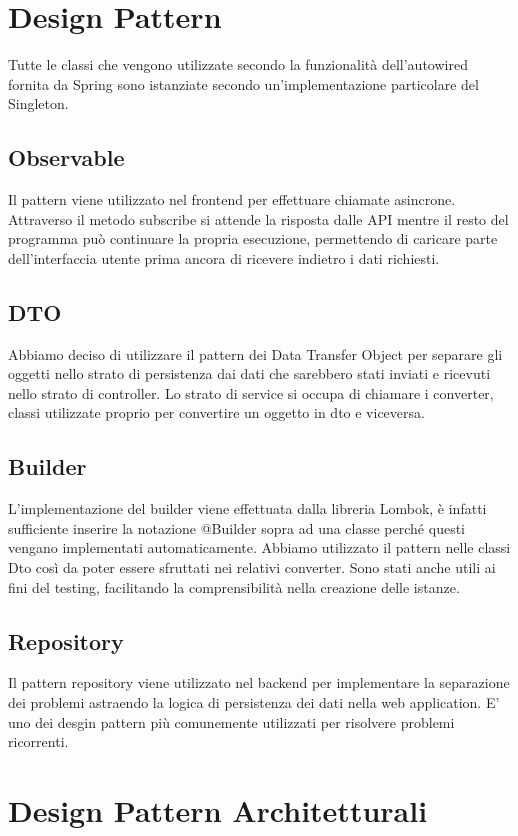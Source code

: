 \documentclass{article}
\begin{document}
\section{Design Pattern}
Tutte le classi che vengono utilizzate secondo la funzionalità dell’autowired fornita da Spring sono istanziate secondo un’implementazione particolare del Singleton.\\
\subsection{Observable}
Il pattern viene utilizzato nel frontend per effettuare chiamate asincrone. Attraverso il metodo subscribe si attende la risposta dalle API mentre il resto del programma può continuare la propria esecuzione, permettendo di caricare parte dell’interfaccia utente prima ancora di ricevere indietro i dati richiesti.
\subsection{DTO}
Abbiamo deciso di utilizzare il pattern dei Data Transfer Object per separare gli oggetti nello strato di persistenza dai dati che sarebbero stati inviati e ricevuti nello strato di controller. Lo strato di service si occupa di chiamare i converter, classi utilizzate proprio per convertire un oggetto in dto e viceversa.
\subsection{Builder}
L’implementazione del builder viene effettuata dalla libreria Lombok, è infatti sufficiente inserire la notazione @Builder sopra ad una classe perché questi vengano implementati automaticamente. Abbiamo utilizzato il pattern nelle classi Dto così da poter essere sfruttati nei relativi converter. Sono stati anche utili ai fini del testing, facilitando la comprensibilità nella creazione delle istanze.
\subsection{Repository} 
Il pattern repository viene utilizzato nel backend per implementare la separazione dei problemi astraendo la logica di persistenza dei dati nella web application. E' uno dei desgin pattern più comunemente utilizzati per risolvere problemi ricorrenti.
\clearpage
\section{Design Pattern Architetturali}
\end{document}
